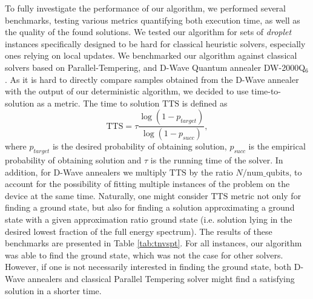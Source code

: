 To fully investigate the performance of our algorithm, we performed several
benchmarks, testing various metrics quantifying both execution time, as well as
the quality of the found solutions. We tested our algorithm for sets of
\emph{droplet} instances specifically designed to be hard for classical
heuristic solvers, especially ones relying on local updates. We benchmarked our
algorithm against classical solvers based on Parallel-Tempering, and D-Wave
Quantum annealer DW-2000Q$_6$. As it is hard to directly compare samples
obtained from the D-Wave annealer with the output of our deterministic
algorithm, we decided to use time-to-solution as a metric. The time to solution
$\mbox{TTS}$ is defined as
    \begin{equation}
      \label{eq:tts}
      \mbox{TTS} = \tau \frac{\log(1 - p_{target})}{\log(1 - p_{succ})},
    \end{equation}
    where $p_{target}$ is the desired probability of obtaining solution, $p_{succ}$
    is the empirical probability of obtaining solution and $\tau$ is the running
    time of the solver. In addition, for D-Wave annealers we multiply $\mbox{TTS}$
    by the ratio $N/\mbox{num\_qubits}$, to account for the possibility of fitting
    multiple instances of the problem on the device at the same time. Naturally,
    one might consider $\mbox{TTS}$ metric not only for finding a ground state, but
also for finding a solution approximating a ground state with a given
approximation ratio ground state (i.e. solution lying in the desired lowest
fraction of the full energy spectrum). The results of these benchmarks are
presented in Table \ref{tab:tnvspt}. For all instances, our algorithm was able
to find the ground state, which was not the case for other solvers. However, if
one is not necessarily interested in finding the ground state, both D-Wave
annealers and classical Parallel Tempering solver might find a satisfying
solution in a shorter time.
